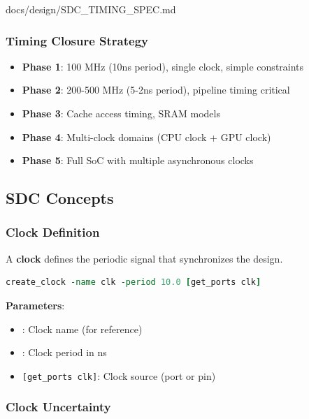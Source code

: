 \begin{relocated}{docs/design/SDC_TIMING_SPEC.md}
\subsubsection{Timing Closure Strategy}\label{ds:ch:sdc-timing-spec:timing-closure-strategy}

\begin{itemize}
\tightlist
\item
  \textbf{Phase 1}: 100 MHz (10ns period), single clock, simple
  constraints
\item
  \textbf{Phase 2}: 200-500 MHz (5-2ns period), pipeline timing critical
\item
  \textbf{Phase 3}: Cache access timing, SRAM models
\item
  \textbf{Phase 4}: Multi-clock domains (CPU clock + GPU clock)
\item
  \textbf{Phase 5}: Full SoC with multiple asynchronous clocks
\end{itemize}

\subsection{SDC Concepts}\label{ds:ch:sdc-timing-spec:sdc-concepts}

\subsubsection{Clock Definition}\label{ds:ch:sdc-timing-spec:clock-definition}

A \textbf{clock} defines the periodic signal that synchronizes the
design.

\begin{lstlisting}[language=tcl]
create_clock -name clk -period 10.0 [get_ports clk]
\end{lstlisting}

\textbf{Parameters}:

\begin{itemize}
\tightlist
\item
  : Clock name (for reference)
\item
  : Clock period in ns
\item
  \texttt{[get\_\allowbreak{}ports\ clk]}: Clock source (port or pin)
\end{itemize}

\subsubsection{Clock Uncertainty}\label{ds:ch:sdc-timing-spec:clock-uncertainty}


\end{relocated}
